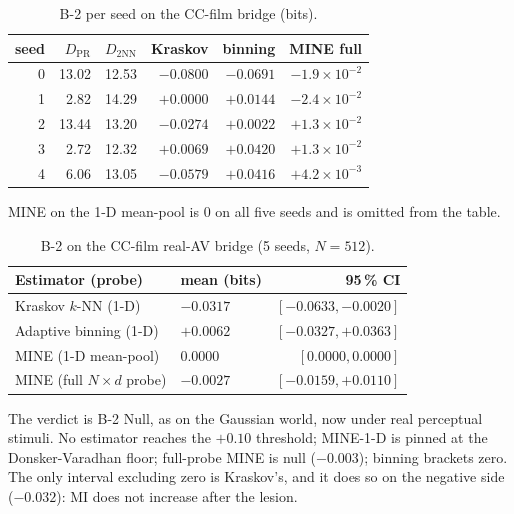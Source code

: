 \documentclass{article}
\begin{document}
\begin{table}[ht]
  \centering
  \caption{B-2 per seed on the CC-film bridge (bits).}
  \label{tab:ccfilm-perseed}
  \begin{tabular}{rrrrrr}
    \toprule
    seed & $D_{\mathrm{PR}}$ & $D_{\mathrm{2NN}}$ & Kraskov & binning & MINE full \\
    \midrule
    0 & 13.02 & 12.53 & $-0.0800$ & $-0.0691$ & $-1.9\times 10^{-2}$ \\
    1 & 2.82  & 14.29 & $+0.0000$ & $+0.0144$ & $-2.4\times 10^{-2}$ \\
    2 & 13.44 & 13.20 & $-0.0274$ & $+0.0022$ & $+1.3\times 10^{-2}$ \\
    3 & 2.72  & 12.32 & $+0.0069$ & $+0.0420$ & $+1.3\times 10^{-2}$ \\
    4 & 6.06  & 13.05 & $-0.0579$ & $+0.0416$ & $+4.2\times 10^{-3}$ \\
    \bottomrule
  \end{tabular}
\end{table}

MINE on the 1-D mean-pool is $0$ on all five seeds and is omitted from
the table.

\begin{table}[ht]
  \centering
  \caption{B-2 on the CC-film real-AV bridge (5 seeds, $N=512$).}
  \label{tab:ccfilm-b2}
  \begin{tabular}{llr}
    \toprule
    Estimator (probe) & mean (bits) & 95\,\% CI \\
    \midrule
    Kraskov $k$-NN (1-D)    & $-0.0317$ & $[-0.0633, -0.0020]$ \\
    Adaptive binning (1-D)  & $+0.0062$ & $[-0.0327, +0.0363]$ \\
    MINE (1-D mean-pool)    & $0.0000$  & $[0.0000, 0.0000]$ \\
    MINE (full $N\times d$ probe) & $-0.0027$ & $[-0.0159, +0.0110]$ \\
    \bottomrule
  \end{tabular}
\end{table}

The verdict is B-2 Null, as on the Gaussian world, now under real
perceptual stimuli. No estimator reaches the $+0.10$ threshold; MINE-1-D is
pinned at the Donsker-Varadhan floor; full-probe MINE is null
($-0.003$); binning brackets zero. The only interval excluding zero is
Kraskov's, and it does so on the negative side ($-0.032$): MI does not
increase after the lesion.
\end{document}
